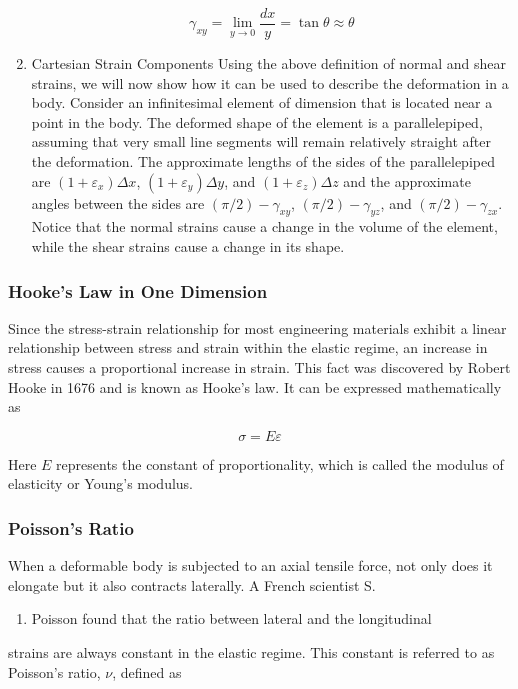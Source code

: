 \documentclass[a4paper,openany,nobib]{tufte-book}
\begin{document}
\begin{enumerate}
$$\gamma _{xy} = \mathop {\lim }\limits_{y \to 0} \frac{dx}{y} = \tan \theta  \approx \theta$$

\item Cartesian Strain Components
\label{cartesian-strain-components}
Using the above definition of normal and shear strains, we will now show
how it can be used to describe the deformation in a body. Consider an
infinitesimal element of dimension that is located near a point in the
body. The deformed shape of the element is a parallelepiped, assuming
that very small line segments will remain relatively straight after the
deformation. The approximate lengths of the sides of the parallelepiped
are \((1 + \varepsilon_x)\Delta x\), \((1 + \varepsilon_y)\Delta y\), and
\((1 + \varepsilon_z)\Delta z\) and the approximate angles between the
sides are \((\pi /2) - \gamma_{xy}\), \((\pi /2) - \gamma_{yz}\), and
\((\pi /2) - \gamma _{zx}\). Notice that the normal strains cause a change
in the volume of the element, while the shear strains cause a change in
its shape.
\end{enumerate}

\subsubsection{Hooke's Law in One Dimension}
\label{hookes-law-in-one-dimension}
Since the stress-strain relationship for most engineering materials
exhibit a linear relationship between stress and strain within the
elastic regime, an increase in stress causes a proportional increase in
strain. This fact was discovered by Robert Hooke in 1676 and is known as
Hooke's law. It can be expressed mathematically as

$$\sigma  = E\varepsilon$$

Here \(E\) represents the constant of proportionality, which is called the
modulus of elasticity or Young's modulus.

\subsubsection{Poisson's Ratio}
\label{poissons-ratio}
When a deformable body is subjected to an axial tensile force, not only
does it elongate but it also contracts laterally. A French scientist S.
\begin{enumerate}
\item Poisson found that the ratio between lateral and the longitudinal
\end{enumerate}
strains are always constant in the elastic regime. This constant is
referred to as Poisson's ratio, \(\nu\), defined as
\end{document}

